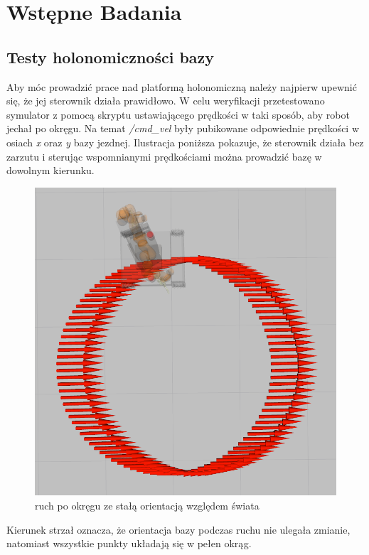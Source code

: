\section{Wstępne Badania}
\label{wstepne_badania}

	\subsection{Testy holonomiczności bazy}
		Aby móc prowadzić prace nad platformą holonomiczną należy najpierw upewnić się, że jej sterownik działa prawidłowo.
		W celu weryfikacji przetestowano symulator z pomocą skryptu ustawiającego prędkości w taki sposób, aby robot jechał po okręgu. 
		Na temat \textit{/cmd\_vel} były pubikowane odpowiednie prędkości w osiach  \textit{x} oraz \textit{y} bazy jezdnej.
		Ilustracja poniższa pokazuje, że sterownik działa bez zarzutu i sterując wspomnianymi prędkościami można prowadzić bazę w dowolnym kierunku.
		
		\begin{figure}
			\centering
			\includegraphics[width=\linewidth]{imgs/wstepne_badania/circle.png}
			\caption{ruch po okręgu ze stałą orientacją względem świata}
			\label{fig:tf}
		\end{figure}

		Kierunek strzał oznacza, że orientacja bazy podczas ruchu nie ulegała zmianie, natomiast wszystkie punkty układają się w pełen okrąg.
		
